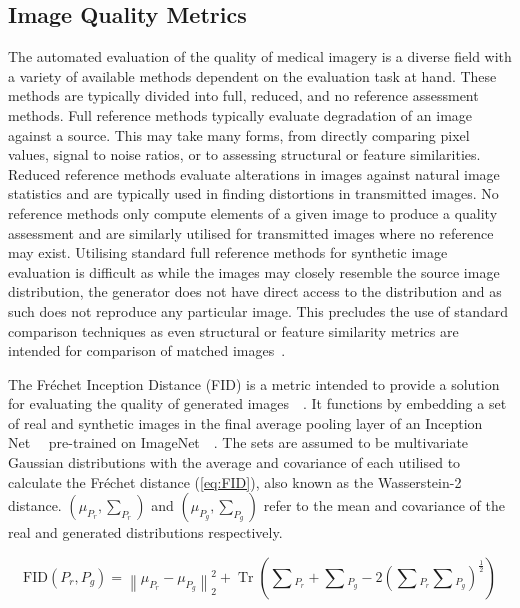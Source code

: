 \documentclass{article}
\newcommand{\norm}[1]{\left\lVert#1\right\rVert}
\DeclareMathOperator{\Tr}{Tr}
\begin{document}
\subsection{Image Quality Metrics}
The automated evaluation of the quality of medical imagery is a diverse field with a variety of available methods dependent on the evaluation task at hand. These methods are typically divided into full, reduced, and no reference assessment methods. Full reference methods typically evaluate degradation of an image against a source. This may take many forms, from directly comparing pixel values, signal to noise ratios, or to assessing structural or feature similarities. Reduced reference methods evaluate alterations in images against natural image statistics and are typically used in finding distortions in transmitted images. No reference methods only compute elements of a given image to produce a quality assessment and are similarly utilised for transmitted images where no reference may exist. Utilising standard full reference methods for synthetic image evaluation is difficult as while the images may closely resemble the source image distribution, the generator does not have direct access to the distribution and as such does not reproduce any particular image. This precludes the use of standard comparison techniques as even structural or feature similarity metrics are intended for comparison of matched images~\cite{thankiMedicalImagingIts2018}. 

The Fréchet Inception Distance (FID) is a metric intended to provide a solution for evaluating the quality of generated images~~\cite{heuselGANsTrainedTwo2018}. It functions by embedding a set of real and synthetic images in the final average pooling layer of an Inception Net~~\cite{szegedyRethinkingInceptionArchitecture2015} pre-trained on ImageNet~~\cite{russakovskyImageNetLargeScale2015}. The sets are assumed to be multivariate Gaussian distributions with the average and covariance of each utilised to calculate the Fréchet distance (\ref{eq:FID}), also known as the Wasserstein-2 distance. $(\mu_{P_{r}}, \sum_{P_{r}})$ and $(\mu_{P_{g}}, \sum_{P_{g}})$ refer to the mean and covariance of the real and generated distributions respectively.

\begin{equation} \label{eq:FID}
\text{FID}(P_{r}, P_{g}) = \norm{\mu_{P_{r}} - \mu_{P_{g}}}^2_2 + \Tr{(\sum{_{P_{r}}} + \sum{_{P_{g}}} - 2(\sum{_{P_{r}}}\sum{_{P_{g}}})^\frac{1}{2})}
\end{equation}
\end{document}
